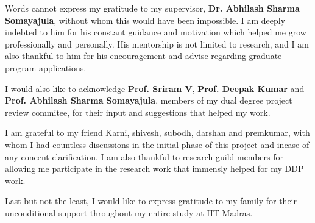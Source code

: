 \acknowledgements
Words cannot express my gratitude to my supervisor, {\bf Dr. Abhilash Sharma Somayajula}, 
without whom this would have been impossible. I am deeply indebted to him for 
his constant guidance and motivation which helped me grow professionally and 
personally. His mentorship is not limited to research, and I am also thankful 
to him for his encouragement and advise regarding graduate program applications.

I would also like to acknowledge {\bf Prof. Sriram V}, {\bf Prof. Deepak Kumar} and 
{\bf Prof. Abhilash Sharma Somayajula}, members of my dual degree project review commitee, for 
their input and suggestions that helped my work.

I am grateful to my friend Karni, shivesh, subodh, darshan and premkumar, with whom I had countless discussions 
in the initial phase of this project and incase of any concent clarification.
I am also thankful to research guild members for allowing me participate in the research work that 
immensly helped for my DDP work.

Last but not the least, I would like to express gratitude to my family for 
their unconditional support throughout my entire study at IIT Madras.